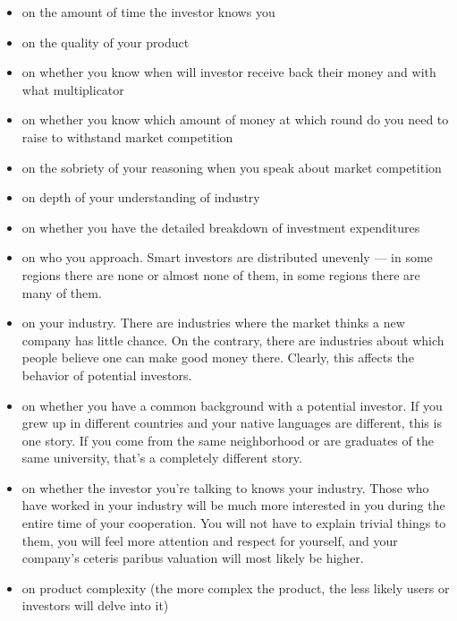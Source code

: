 \documentclass[11pt]{article}
\theoremstyle{remark}
\theoremstyle{definition}
\begin{document}
\begin{itemize}

\item on the amount of time the investor knows you

\item on the quality of your product

\item on whether you know when will investor receive back their money and with what multiplicator

\item on whether you know which amount of money at which round do you need to raise to withstand market competition

\item on the sobriety of your reasoning when you speak about market competition

\item on depth of your understanding of industry

\item on whether you have the detailed breakdown of investment expenditures

\item on who you approach. Smart investors are distributed unevenly --- in some regions there are none or almost none of them, in some regions there are many of them.

\item on your industry. There are industries where the market thinks a new company has little chance. On the contrary, there are industries about which people believe one can make good money there. Clearly, this affects the behavior of potential investors.

\item on whether you have a common background with a potential investor. If you grew up in different countries and your native languages are different, this is one story. If you come from the same neighborhood or are graduates of the same university, that's a completely different story.


\item on whether the investor you're talking to knows your industry. Those who have worked in your industry will be much more interested in you during the entire time of your cooperation. You will not have to explain trivial things to them, you will feel more attention and respect for yourself, and your company's ceteris paribus valuation will most likely be higher.

\item on product complexity (the more complex the product, the less likely users or investors will delve into it) 




\end{itemize}
\end{document}
